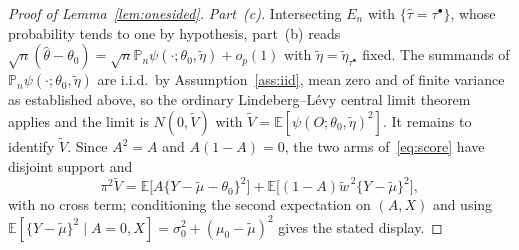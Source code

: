 \documentclass[11pt]{article}
\theoremstyle{plain}
\theoremstyle{definition}
\theoremstyle{remark}
\newcommand{\E}{\mathbb{E}}
\newcommand{\Pn}{\mathbb{P}_n}
\newcommand{\mz}{\mu_0}
\newcommand{\that}{\widehat{\tau}}
\newcommand{\thetahat}{\widehat{\theta}}
\newcommand{\etatil}{\widetilde{\eta}}
\newcommand{\wtil}{\widetilde{w}}
\newcommand{\mtil}{\widetilde{\mu}}
\newcommand{\Vtil}{\widetilde{V}}
\begin{document}
\begin{proof}[Proof of Lemma~\ref{lem:onesided}]
\emph{Part~(c).} Intersecting $E_n$ with $\{\that=\tau^\bullet\}$, whose
probability tends to one by hypothesis, part~(b) reads
$\sqrt n(\thetahat-\theta_0)=\sqrt n\Pn\psi(\cdot;\theta_0,\etatil)+o_p(1)$ with
$\etatil=\etatil_{\tau^\bullet}$ fixed. The summands of
$\Pn\psi(\cdot;\theta_0,\etatil)$ are i.i.d.\ by Assumption~\ref{ass:iid}, mean
zero and of finite variance as established above, so the ordinary
Lindeberg--L\'evy central limit theorem applies and the limit is $N(0,\Vtil)$ with
$\Vtil=\E[\psi(O;\theta_0,\etatil)^2]$. It remains to identify $\Vtil$. Since
$A^2=A$ and $A(1-A)=0$, the two arms of~\eqref{eq:score} have disjoint support
and
\[
  \pi^2\Vtil=\E\bigl[A\{Y-\mtil-\theta_0\}^2\bigr]
   +\E\bigl[(1-A)\wtil^{\,2}\{Y-\mtil\}^2\bigr],
\]
with no cross term; conditioning the second expectation on $(A,X)$ and using
$\E[\{Y-\mtil\}^2\mid A=0,X]=\sigma_0^2+(\mz-\mtil)^2$ gives the stated
display.
\end{proof}
\end{document}
